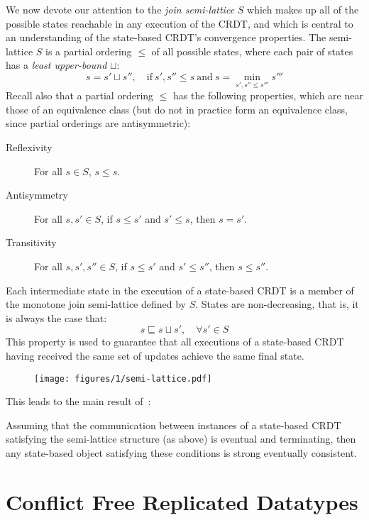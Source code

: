 We now devote our attention to the \textit{join semi-lattice} $S$ which makes up
all of the possible states reachable in any execution of the CRDT, and which is
central to an understanding of the state-based CRDT's convergence properties.
The semi-lattice $S$ is a partial ordering $\leq$ of all possible states, where
each pair of states has a \textit{least upper-bound} $\sqcup$:
\[
  s = s' \sqcup s'',\quad \mathrm{if}~
    s', s'' \leq s~\mathrm{and}~
    s = \min_{s', s'' \leq s'''} s'''
\]
Recall also that a partial ordering $\leq$ has the following properties, which
are near those of an equivalence class (but do not in practice form an
equivalence class, since partial orderings are antisymmetric):
\begin{description}
  \item[Reflexivity] For all $s \in S$, $s \leq s$.
  \item[Antisymmetry] For all $s, s' \in S$, if $s \leq s'$ and $s' \leq s$,
    then $s = s'$.
  \item[Transitivity] For all $s, s', s'' \in S$, if $s \leq s'$ and $s' \leq
    s''$, then $s \leq s''$.
\end{description}

Each intermediate state in the execution of a state-based CRDT is a member of
the monotone join semi-lattice defined by $S$. States are non-decreasing, that
is, it is always the case that:
\[
  s \sqsubseteq s \sqcup s',\quad \forall s' \in S
\]
This property is used to guarantee that all executions of a state-based CRDT
having received the same set of updates achieve the same final state.

\begin{figure}[H]
  \centering
  \texttt{[image: figures/1/semi-lattice.pdf]}
  \caption{\TODO}
\end{figure}

\TODO This leads to the main result of~\citep{shapiro11}:
\begin{theorem}
  Assuming that the communication between instances of a state-based CRDT
  satisfying the semi-lattice structure (as above) is eventual and terminating,
  then any state-based object satisfying these conditions is strong eventually
  consistent.
\end{theorem}

\section{Conflict Free Replicated Datatypes}
